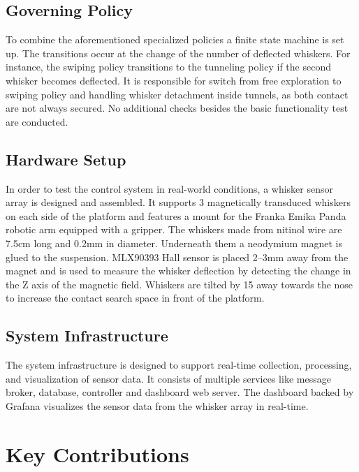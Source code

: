 \subsection{Governing Policy}
To combine the aforementioned specialized policies a finite state machine is set up.
The transitions occur at the change of the number of deflected whiskers.
For instance, the swiping policy transitions to the tunneling policy if the second whisker becomes deflected.
It is responsible for switch from free exploration to swiping policy and handling whisker detachment inside tunnels, as both contact are not always secured.
No additional checks besides the basic functionality test are conducted.

\subsection{Hardware Setup}
In order to test the control system in real-world conditions, a whisker sensor array is designed and assembled.
It supports 3 magnetically transduced whiskers on each side of the platform and features a mount for the Franka Emika Panda robotic arm equipped with a gripper.
The whiskers made from nitinol wire are 7.5cm long and 0.2mm in diameter.
Underneath them a neodymium magnet is glued to the suspension.
MLX90393 Hall sensor is placed 2--3mm away from the magnet and is used to measure the whisker deflection by detecting the change in the Z axis of the magnetic field.
Whiskers are tilted by 15\degree{} away towards the nose to increase the contact search space in front of the platform.

\subsection{System Infrastructure}
The system infrastructure is designed to support real-time collection, processing, and visualization of sensor data.
It consists of multiple services like message broker, database, controller and dashboard web server.
The dashboard backed by Grafana visualizes the sensor data from the whisker array in real-time.


\section{Key Contributions}

